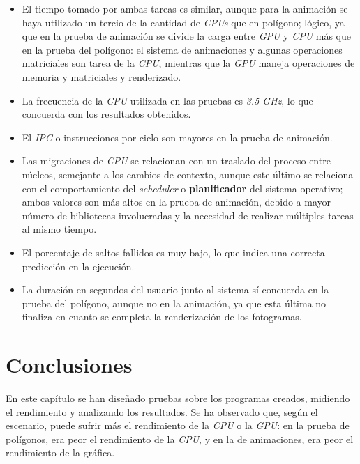 \begin{itemize}
    \item El tiempo tomado por ambas tareas es similar, aunque para la animación se haya utilizado un tercio de la cantidad de \textit{CPUs} que en polígono; lógico, ya que en la prueba de animación se divide la carga entre \textit{GPU} y \textit{CPU} más que en la prueba del polígono: el sistema de animaciones y algunas operaciones matriciales son tarea de la \textit{CPU}, mientras que la \textit{GPU} maneja operaciones de memoria y matriciales y renderizado.
    
    \item La frecuencia de la \textit{CPU} utilizada en las pruebas es \textit{3.5 GHz}, lo que concuerda con los resultados obtenidos.
    
    \item El \textit{IPC} o instrucciones por ciclo son mayores en la prueba de animación.
    
    \item Las migraciones de \textit{CPU} se relacionan con un traslado del proceso entre núcleos, semejante a los cambios de contexto, aunque este último se relaciona con el comportamiento del \textit{scheduler} o \textbf{planificador} del sistema operativo; ambos valores son más altos en la prueba de animación, debido a mayor número de bibliotecas involucradas y la necesidad de realizar múltiples tareas al mismo tiempo.

    \item El porcentaje de saltos fallidos es muy bajo, lo que indica una correcta predicción en la ejecución.

    \item La duración en segundos del usuario junto al sistema sí concuerda en la prueba del polígono, aunque no en la animación, ya que esta última no finaliza en cuanto se completa la renderización de los fotogramas.
    
\end{itemize}

\section{Conclusiones}
En este capítulo se han diseñado pruebas sobre los programas creados, midiendo el rendimiento y analizando los resultados. Se ha observado que, según el escenario, puede sufrir más el rendimiento de la \textit{CPU} o la \textit{GPU}: en la prueba de polígonos, era peor el rendimiento de la \textit{CPU}, y en la de animaciones, era peor el rendimiento de la gráfica.
